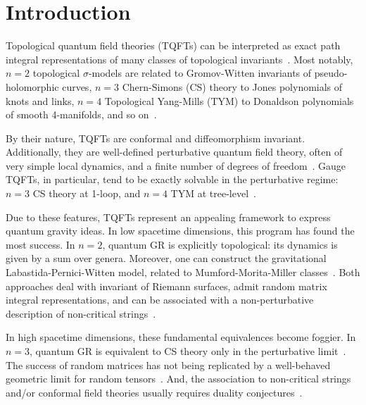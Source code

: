 \documentclass[../main.tex]{subfiles}
\begin{document}
\section{Introduction}\label{sec:introduction}

Topological quantum field theories (TQFTs) can be interpreted as exact path integral representations of many classes of topological invariants~\cite{birmingham1991a,blau1993a,cordes1995a}. Most notably, $ n=2 $ topological $ \sigma $-models are related to Gromov-Witten invariants of pseudo-holomorphic curves, $ n=3 $ Chern-Simons (CS) theory to Jones polynomials of knots and links, $ n=4 $ Topological Yang-Mills (TYM) to Donaldson polynomials of smooth 4-manifolds, and so on~\cite{witten1988c,witten1989a,witten1988d}.

By their nature, TQFTs are conformal and diffeomorphism invariant. Additionally, they are well-defined perturbative quantum field theory, often of very simple local dynamics, and a finite number of degrees of freedom~\cite{brandhuber1994a,werneck1993a,sadovski2018b,sadovski2020}. Gauge TQFTs, in particular, tend to be exactly solvable in the perturbative regime: $ n=3 $ CS theory at 1-loop, and $ n=4 $ TYM at tree-level~\cite{blasi1991a,maggiore1992a,piguet1995a,sadovski2017c,sadovski2018a}.

Due to these features, TQFTs represent an appealing framework to express quantum gravity ideas. In low spacetime dimensions, this program has found the most success. In $n=2$, quantum GR is explicitly topological: its dynamics is given by a sum over genera. Moreover, one can construct the gravitational Labastida-Pernici-Witten model, related to Mumford-Morita-Miller classes~\cite{labastida1988b,labastida1988a}. Both approaches deal with invariant of Riemann surfaces, admit random matrix integral representations, and can be associated with a non-perturbative description of non-critical strings~\cite{douglas1990a,dijkgraaf1991a,gross1990a,witten1990a,kontsevich1992a,dijkgraaf2002a}.

In high spacetime dimensions, these fundamental equivalences become foggier. In $ n=3 $, quantum GR is equivalent to CS theory only in the perturbative limit~\cite{achucarro1986a,witten1988b,witten2007a}. The success of random matrices has not being replicated by a well-behaved geometric limit for random tensors~\cite{gurau2024a,carrozza2024a}. And, the association to non-critical strings and/or conformal field theories usually requires duality conjectures~\cite{carlip2005a,manschot2007a,yin2008a,elshowk2012a,carlip2023a,ma2024a}.
\end{document}
